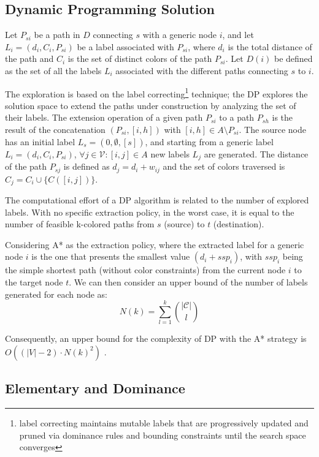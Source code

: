 \documentclass[pdflatex,sn-mathphys-num]{sn-jnl}
\begin{document}
\subsection{Dynamic Programming Solution}
Let $P_{si}$ be a path in $D$ connecting $s$ with a generic node $i$, and 
let $L_i = (d_i,C_i,P_{si})$ be a label associated with $P_{si}$, where $d_i$ is the total distance
of the path and $C_i$ is the set of distinct colors of the path $P_{si}$.
Let $D(i)$ be defined as the set of all the labels $L_i$ associated with the different
paths connecting $s$ to $i$.

The exploration is based on the label correcting\footnote{label correcting maintains mutable labels that are progressively updated and pruned via dominance rules and bounding constraints until the search space converges} technique; the DP explores
the solution space to extend the paths under construction by analyzing the
set of their labels. The extension operation of a given path $P_{si}$ to a path $P_{sh}$
is the result of the concatenation $(P_{si},[i,h])$ with $[i,h] \in A \setminus P_{si}$.
The source node has an initial label $L_s = (0,\emptyset,[s])$, and starting from a generic 
label $L_i = (d_i,C_i,P_{si})$, $\forall j \in \mathcal{V} : [i,j] \in A$ new labels $L_j$ are generated.
The distance of the path $P_{sj}$ is defined as $d_j = d_i + w_{ij}$ and the set of colors traversed is $C_j= C_i \cup \{C([i,j])\}$.

The computational effort of a DP algorithm is related to the number of explored labels.
With no specific extraction policy, in the worst case, it is equal to the number of feasible k-colored paths
from $s$ (source) to $t$ (destination).

Considering A* as the extraction policy, where the extracted label
for a generic node $i$ is the one that presents the smallest
value $(d_i + ssp_i)$, with $ssp_i$ being the simple shortest path (without color constraints) from the current node $i$ to the
target node $t$.
We can then consider an upper bound of the number of labels generated for each node as:
$$N(k) = \sum_{l=1}^{k} \binom{|\mathcal{C}|}{l}$$

Consequently, an upper bound for the complexity of DP with the A* strategy is $O((|V |-2)\cdot N(k)^2)$ \cite{Ferone2021}.

\subsection{Elementary and Dominance}
\end{document}

